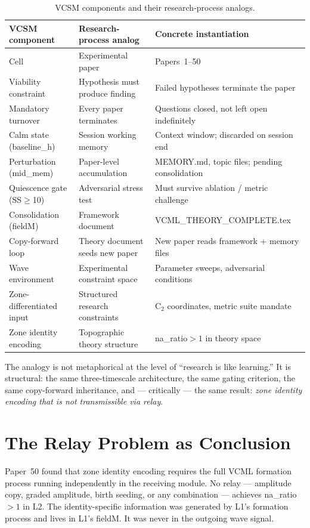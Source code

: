 \documentclass[11pt,a4paper]{article}
\begin{document}
\begin{table}[h]
\centering
\caption{VCSM components and their research-process analogs.}
\label{tab:mapping}
\begin{tabular}{p{4.5cm}p{4.5cm}p{4.5cm}}
\toprule
\textbf{VCSM component} & \textbf{Research-process analog} & \textbf{Concrete instantiation} \\
\midrule
Cell & Experimental paper & Papers~1--50 \\
Viability constraint & Hypothesis must produce finding & Failed hypotheses terminate the paper \\
Mandatory turnover & Every paper terminates & Questions closed, not left open indefinitely \\
Calm state (baseline\_h) & Session working memory & Context window; discarded on session end \\
Perturbation (mid\_mem) & Paper-level accumulation & MEMORY.md, topic files; pending consolidation \\
Quiescence gate (SS$\geq$10) & Adversarial stress test & Must survive ablation / metric challenge \\
Consolidation (fieldM) & Framework document & VCML\_THEORY\_COMPLETE.tex \\
Copy-forward loop & Theory document seeds new paper & New paper reads framework + memory files \\
Wave environment & Experimental constraint space & Parameter sweeps, adversarial conditions \\
Zone-differentiated input & Structured research constraints & C$_2$ coordinates, metric suite mandate \\
Zone identity encoding & Topographic theory structure & na\_ratio$>1$ in theory space \\
\bottomrule
\end{tabular}
\end{table}

The analogy is not metaphorical at the level of ``research is like learning.''
It is structural: the same three-timescale architecture, the same gating criterion,
the same copy-forward inheritance, and --- critically --- the same result:
\emph{zone identity encoding that is not transmissible via relay}.

\section{The Relay Problem as Conclusion}

Paper~50 found that zone identity encoding requires the full VCML formation
process running independently in the receiving module.
No relay --- amplitude copy, graded amplitude, birth seeding, or any
combination --- achieves na\_ratio$>1$ in L2.
The identity-specific information was generated by L1's formation process and
lives in L1's fieldM.
It was never in the outgoing wave signal.
\end{document}
